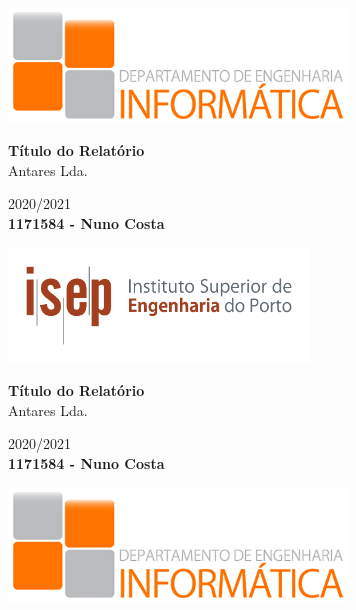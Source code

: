 \documentclass[10pt,titlepage]{article}
\makeatletter
\newcommand\frontmatter{%
    \cleardoublepage
  \pagenumbering{roman}}
\makeatother
\begin{document}
\frontmatter
\begin{titlepage}
   \begin{center}
        \vspace*{1cm}

        \includegraphics[width=8.9916cm]{DEI_logo.png}

        \vfill
        \textbf{\huge Título do Relatório}
        \vspace{0.3cm}
        \\{\large Antares Lda.}
	    \vspace{0.7cm}
        
        {\Large 2020/2021}
        \vspace{1.6cm}
        \\\textbf{\large 1171584 - Nuno Costa}

        \vfill

        \includegraphics[width=8.001cm]{ISEP_logo.png}

    \newpage

       \vspace*{1cm}

        \textbf{\huge Título do Relatório}
        \vspace{0.5cm}
        \\{\large Antares Lda.}
        \vspace{1cm}
        
        {\Large 2020/2021}
        \vspace{1.6cm}
        \\\textbf{\large 1171584 - Nuno Costa}

        \vfill

        \includegraphics[width=8.9916cm]{DEI_logo.png}


\end{center}
\end{titlepage}
\end{document}
